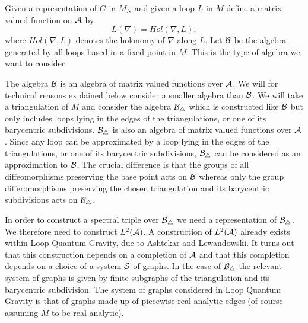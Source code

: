 \documentclass[12pt]{article}
\def\ca{{\cal A}}
\def\cb{{\cal B}}
\def\cs{{\cal S}}
\begin{document}
Given a representation of $G$ in $M_N$ and given a loop $L$ in $M$ define a matrix valued function on $\ca$ by
$$L(\nabla )=Hol(\nabla ,L),$$
where $Hol(\nabla ,L)$ denotes the holonomy of $\nabla$ along $L$. Let $\cb$ be the algebra generated by all loops based in a fixed point in $M$. This is the type of algebra we want to consider. 

The algebra $\cb$ is an algebra of matrix valued functions over $\ca$. We will for technical reasons explained below consider a  smaller algebra than $\cb$. We will take a triangulation of $M$ and consider the algebra $\cb_\triangle$ which is constructed like $\cb$ but only includes loops lying in the edges of the triangulations, or one of its barycentric subdivisions. $\cb_\triangle$ is also an algebra of matrix valued functions over $\ca$. Since any loop can be approximated by a loop lying in the edges of the triangulations, or one of its barycentric subdivisions, $\cb_\triangle$ can be considered as an approximation to $\cb$. The crucial difference is that the groups of all diffeomorphisms preserving the base point acts on $\cb$ whereas only the group differomorphisms preserving the chosen triangulation and its barycentric subdivisions acts on $\cb_\triangle$.



In order to construct a spectral triple over $\cb_\triangle$ we need a representation of $\cb_\triangle$. We therefore need to construct $L^2(\ca )$. 
A construction of  $L^2(\ca )$ already exists within Loop Quantum Gravity, due to Ashtekar and Lewandowski. It turns out that this construction depends on a completion of $\ca$ and that this completion depends on a choice of a system $\cs$ of graphs. In the case of $\cb_\triangle$ the relevant system of graphs is given by finite subgraphs of the triangulation and its barycentric subdivision. The system of graphs considered in Loop Quantum Gravity is that of graphs made up of piecewise  real analytic edges (of course assuming $M$ to be real analytic). 
\end{document}
